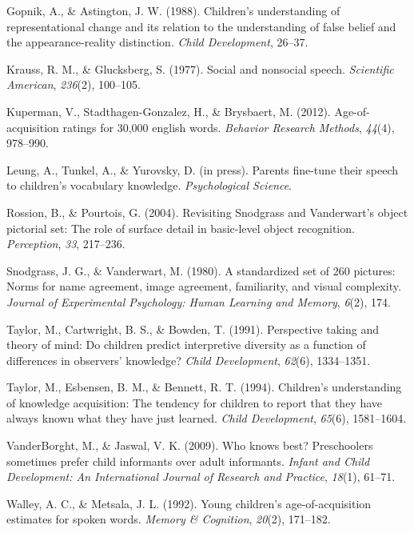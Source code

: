 \documentclass[10pt, letterpaper]{article}
\newenvironment{CSLReferences}%
  {}%
  {\par}
\begin{document}
\begin{CSLReferences}{1}{0}
\leavevmode\hypertarget{ref-gopnik1988}{}%
Gopnik, A., \& Astington, J. W. (1988). Children's understanding of
representational change and its relation to the understanding of false
belief and the appearance-reality distinction. \emph{Child Development},
26--37.

\leavevmode\hypertarget{ref-krauss1977}{}%
Krauss, R. M., \& Glucksberg, S. (1977). Social and nonsocial speech.
\emph{Scientific American}, \emph{236}(2), 100--105.

\leavevmode\hypertarget{ref-kuperman2012}{}%
Kuperman, V., Stadthagen-Gonzalez, H., \& Brysbaert, M. (2012).
Age-of-acquisition ratings for 30,000 english words. \emph{Behavior
Research Methods}, \emph{44}(4), 978--990.

\leavevmode\hypertarget{ref-leung2021}{}%
Leung, A., Tunkel, A., \& Yurovsky, D. (in press). Parents fine-tune
their speech to children's vocabulary knowledge. \emph{Psychological
Science}.

\leavevmode\hypertarget{ref-rossion2004}{}%
Rossion, B., \& Pourtois, G. (2004). {Revisiting Snodgrass and
Vanderwart's object pictorial set: The role of surface detail in
basic-level object recognition}. \emph{Perception}, \emph{33}, 217--236.

\leavevmode\hypertarget{ref-snodgrass1980}{}%
Snodgrass, J. G., \& Vanderwart, M. (1980). A standardized set of 260
pictures: Norms for name agreement, image agreement, familiarity, and
visual complexity. \emph{Journal of Experimental Psychology: Human
Learning and Memory}, \emph{6}(2), 174.

\leavevmode\hypertarget{ref-taylor1991}{}%
Taylor, M., Cartwright, B. S., \& Bowden, T. (1991). Perspective taking
and theory of mind: Do children predict interpretive diversity as a
function of differences in observers' knowledge? \emph{Child
Development}, \emph{62}(6), 1334--1351.

\leavevmode\hypertarget{ref-taylor1994}{}%
Taylor, M., Esbensen, B. M., \& Bennett, R. T. (1994). Children's
understanding of knowledge acquisition: The tendency for children to
report that they have always known what they have just learned.
\emph{Child Development}, \emph{65}(6), 1581--1604.

\leavevmode\hypertarget{ref-vanderborght2009}{}%
VanderBorght, M., \& Jaswal, V. K. (2009). Who knows best? Preschoolers
sometimes prefer child informants over adult informants. \emph{Infant
and Child Development: An International Journal of Research and
Practice}, \emph{18}(1), 61--71.

\leavevmode\hypertarget{ref-walley1992}{}%
Walley, A. C., \& Metsala, J. L. (1992). Young children's
age-of-acquisition estimates for spoken words. \emph{Memory \&
Cognition}, \emph{20}(2), 171--182.

\end{CSLReferences}


\end{document}
